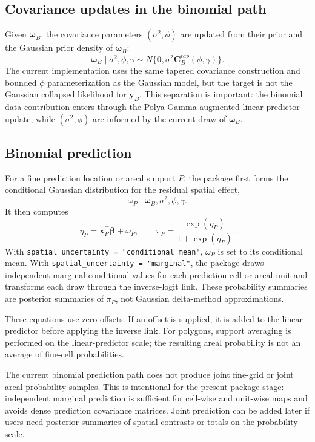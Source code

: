 \documentclass[11pt]{article}
\newcommand{\by}{\bm{y}}
\newcommand{\bbeta}{\bm{\beta}}
\newcommand{\bw}{\bm{\omega}}
\newcommand{\bzero}{\bm{0}}
\newcommand{\bC}{\bm{C}}
\newcommand{\trans}{^\top}
\begin{document}
\subsection{Covariance updates in the binomial path}

Given \(\bw_B\), the covariance parameters \((\sigma^2,\phi)\) are updated
from their prior and the Gaussian prior density of \(\bw_B\):
\begin{equation}
  \bw_B\mid\sigma^2,\phi,\gamma
  \sim N\{\bzero,\sigma^2\bC_B^{tap}(\phi,\gamma)\}.
\end{equation}
The current implementation uses the same tapered covariance construction and
bounded \(\phi\) parameterization as the Gaussian model, but the target is not
the Gaussian collapsed likelihood for \(\by_B\). This separation is important:
the binomial data contribution enters through the Polya-Gamma augmented
linear predictor update, while \((\sigma^2,\phi)\) are informed by the current
draw of \(\bw_B\).

\subsection{Binomial prediction}

For a fine prediction location or areal support \(P\), the package first forms
the conditional Gaussian distribution for the residual spatial effect,
\begin{equation}
  \omega_P\mid\bw_B,\sigma^2,\phi,\gamma.
\end{equation}
It then computes
\begin{equation}
  \eta_P = \bm{x}_P\trans\bbeta+\omega_P,
  \qquad
  \pi_P = \frac{\exp(\eta_P)}{1+\exp(\eta_P)}.
\end{equation}
With \texttt{spatial\_uncertainty = "conditional\_mean"}, \(\omega_P\) is set
to its conditional mean. With \texttt{spatial\_uncertainty = "marginal"}, the
package draws independent marginal conditional values for each prediction
cell or areal unit and transforms each draw through the inverse-logit link.
These probability summaries are posterior summaries of \(\pi_P\), not
Gaussian delta-method approximations.

These equations use zero offsets. If an offset is supplied, it is added to
the linear predictor before applying the inverse link. For polygons, support
averaging is performed on the linear-predictor scale; the resulting areal
probability is not an average of fine-cell probabilities.

The current binomial prediction path does not produce joint fine-grid or
joint areal probability samples. This is intentional for the present package
stage: independent marginal prediction is sufficient for cell-wise and
unit-wise maps and avoids dense prediction covariance matrices. Joint
prediction can be added later if users need posterior summaries of spatial
contrasts or totals on the probability scale.
\end{document}
